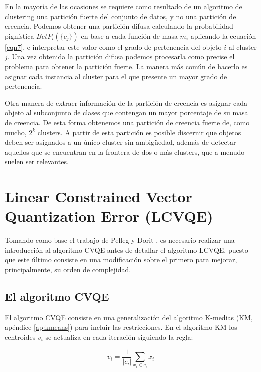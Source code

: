 En la mayoría de las ocasiones se requiere como resultado de un algoritmo de clustering una partición fuerte del conjunto de datos, y no una partición de creencia. Podemos obtener una partición difusa calculando la probabilidad pignística $BetP_i(\{c_j\})$ en base a cada función de masa $m_i$ aplicando la ecuación \ref{eqn7}, e interpretar este valor como el grado de pertenencia del objeto $i$ al cluster $j$. Una vez obtenida la partición difusa podemos procesarla como precise el problema para obtener la partición fuerte. La manera más común de hacerlo es asignar cada instancia al cluster para el que presente un mayor grado de pertenencia.

Otra manera de extraer información de la partición de creencia es asignar cada objeto al subconjunto de clases que contengan un mayor porcentaje de su masa de creencia. De esta forma obtenemos una partición de creencia fuerte de, como mucho, $2^k$ clusters. A partir de esta partición es posible discernir que objetos deben ser asignados a un único cluster sin ambigüedad, además de detectar aquellos que se encuentran en la frontera de dos o más clusters, que a menudo suelen ser relevantes.

\clearpage

\section{Linear Constrained Vector Quantization Error (LCVQE)}

Tomando como base el trabajo de Pelleg y Dorit \cite{LCVQE:2007}, es necesario realizar una introducción al algoritmo \acf{CVQE} antes de detallar el algoritmo \acs{LCVQE}, puesto que este último consiste en una modificación sobre el primero para mejorar, principalmente, su orden de complejidad.

\subsection{El algoritmo CVQE}

El algoritmo CVQE consiste en una generalización del algoritmo K-medias (\acs{KM}, apéndice \ref{ap:kmeans}) para incluir las restricciones. En el algoritmo \acs{KM} los centroides $v_i$ se actualiza en cada iteración siguiendo la regla:

\begin{equation}
v_i = \frac{1}{|c_i|} \sum_{x_i \in c_i} x_i
\label{eqn27}
\end{equation}

